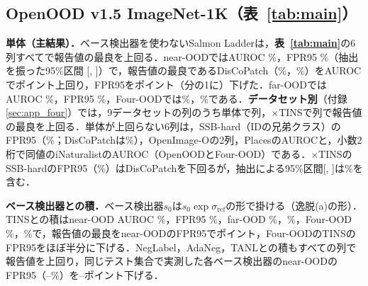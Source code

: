 \documentclass[MIRU,submit]{miru2025j}
\renewcommand\tabref[1]{\textbf{表~\ref{tab:#1}}}   %
\newcommand\secref[1]{\ref{sec:#1}節}
\newcommand\AUC{AUROC}
\newcommand\FPR{FPR95}
\newcommand\sR{\sigma_{\mathrm{ref}}}
\begin{document}
\subsection{OpenOOD v1.5 ImageNet-1K（表~\ref{tab:main}）}
\label{sec:main}
\textbf{単体（主結果）．}ベース検出器を使わないSalmon Ladderは，\tabref{main}の6列すべてで報告値の最良を上回る．near-OODでは\AUC{} \NRAloneNearAuroc\%，\FPR{} \NRAloneNearFpr\%（抽出を振った95\%区間 [\NRAloneNearFprLo, \NRAloneNearFprHi]）で，報告値の最良であるDisCoPatch（\NBestOtherNearAuroc\%，\NBestOtherNearFpr\%）を\AUC{}で\NRAloneGapNearAuroc{}ポイント上回り，\FPR{}を\NRAloneGapNearFpr{}ポイント（\NRAloneNearFprRatio{}分の1に）下げた．far-OODでは\AUC{} \NRAloneFarAuroc\%，\FPR{} \NRAloneFarFpr\%，Four-OODでは\NRAloneFourAuroc\%，\NRAloneFourFpr\%である．\textbf{データセット別}（付録\ref{sec:app_four}）では，9データセットの\NRPerdsCols{}列のうち単体で\NRPerdsWinsAlone{}列，$\times$TINSで\NRPerdsWinsTins{}列で報告値の最良を上回る．単体が上回らない6列は，SSB-hard（IDの兄弟クラス）の\FPR{}（\NRAloneSsbHardFpr\%；DisCoPatchは\NRDiscoSsbHardFpr\%），OpenImage-Oの2列，Placesの\AUC{}と，小数2桁で同値のiNaturalistの\AUC{}（OpenOODとFour-OOD）である．$\times$TINSのSSB-hardの\FPR{}（\NRTinsSsbHardFpr\%）はDisCoPatchを下回るが，抽出による95\%区間[\NRTinsSsbHardFprLo, \NRTinsSsbHardFprHi]は\NRDiscoSsbHardFpr\%を含む．

\textbf{ベース検出器との積．}ベース検出器$s_0$は$s_0\exp\sR$の形で掛ける（逸脱(a)の形）．TINSとの積はnear-OOD \AUC{} \NRTinsNearAuroc\%，\FPR{} \NRTinsNearFpr\%，far-OOD \NRTinsFarAuroc\%，\NRTinsFarFpr\%，Four-OOD \NRTinsFourAuroc\%，\NRTinsFourFpr\%で，報告値の最良をnear-OODの\FPR{}で\NRTinsGapNearFpr{}ポイント，Four-OODのTINSの\FPR{}をほぼ半分に下げる．NegLabel，AdaNeg，TANLとの積もすべての列で報告値を上回り，同じテスト集合で実測した各ベース検出器のnear-OODの\FPR{}（\NRMeasTINSNearFpr--\NRMeasNegLabelNearFpr\%）を\NRGainTANLNearFpr--\NRGainNegLabelNearFpr{}ポイント下げる．

\begin{table}[t]
\centering
\caption{OpenOOD v1.5 ImageNet-1KとFour-OOD（[\%]）．$\dagger$は原論文の報告値（近／遠の平均は本稿で計算）．実測値は同じテスト集合での値（到着順の平均，\secref{exp}）．本手法は$\sR$，抽出6通りの平均（$\times$ベース検出器の行は順序の平均も取る）．\textcolor{sotacol}{$\bigstar$}は列の最良値，\colorbox{upd}{青}は比較手法のすべてを上回る値，括弧の行は最良の比較手法との差（正は本手法が良い）．}
\label{tab:main}
\vspace{0.5mm}

\end{table}
\end{document}
